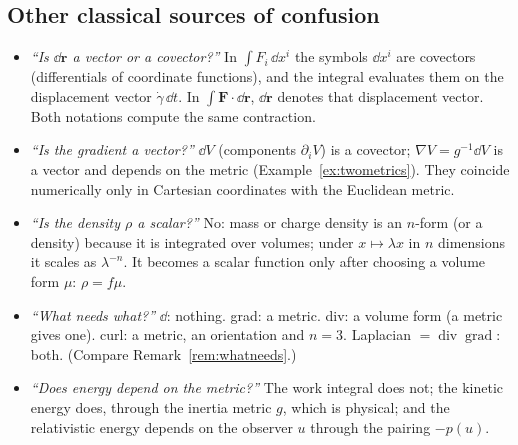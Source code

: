 \subsection{Other classical sources of confusion}\label{sec:phys-confusion}

\begin{itemize}
\item \emph{``Is $\dd\mathbf r$ a vector or a covector?''} In $\int F_i\,\dd x^i$ the symbols $\dd x^i$ are covectors (differentials of coordinate functions), and the integral evaluates them on the displacement vector $\dot\gamma\,\dd t$. In $\int\mathbf F\cdot\dd\mathbf r$, $\dd\mathbf r$ denotes that displacement vector. Both notations compute the same contraction.
\item \emph{``Is the gradient a vector?''} $\dd V$ (components $\partial_iV$) is a covector; $\nabla V=g^{-1}\dd V$ is a vector and depends on the metric (Example~\ref{ex:twometrics}). They coincide numerically only in Cartesian coordinates with the Euclidean metric.
\item \emph{``Is the density $\rho$ a scalar?''} No: mass or charge density is an $n$-form (or a density) because it is integrated over volumes; under $x\mapsto\lambda x$ in $n$ dimensions it scales as $\lambda^{-n}$. It becomes a scalar function only after choosing a volume form $\mu$: $\rho=f\mu$.
\item \emph{``What needs what?''} $\dd$: nothing. grad: a metric. div: a volume form (a metric gives one). curl: a metric, an orientation and $n=3$. Laplacian $=\operatorname{div}\operatorname{grad}$: both. (Compare Remark~\ref{rem:whatneeds}.)
\item \emph{``Does energy depend on the metric?''} The work integral does not; the kinetic energy does, through the inertia metric $g$, which is physical; and the relativistic energy depends on the observer $u$ through the pairing $-p(u)$.
\end{itemize}
